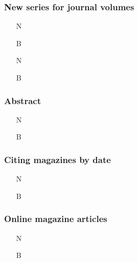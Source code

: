 \documentclass[11pt,letterpaper,oneside]{article}
\begin{document}
\setcounter{subsubsection}{194}
\subsubsection{New series for journal volumes}
\label{14.195}

\begin{itemize}
\item[N] 

\item[B] 

\item[N] 

\item[B] 
\end{itemize}

\setcounter{subsubsection}{196}
\subsubsection{Abstract}

\begin{itemize}
\item[N] 

\item[B] 
\end{itemize}

\setcounter{subsubsection}{198}
\subsubsection{Citing magazines by date}

\begin{itemize}
\item[N] 

\item[B] 
\end{itemize}

\subsubsection{Online magazine articles}

\begin{itemize}
\item[N] 

\item[B] 
\end{itemize}
\end{document}

